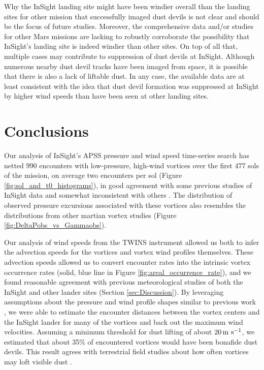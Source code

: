 \documentclass{aastex63}
\begin{document}
Why the InSight landing site might have been windier overall than the landing sites for other mission that successfully imaged dust devils is not clear and should be the focus of future studies. Moreover, the comprehensive data and/or studies for other Mars missions are lacking to robustly corroborate the possibility that InSight's landing site is indeed windier than other sites. On top of all that, multiple cases may contribute to suppression of dust devils at InSight. Although numerous nearby dust devil tracks have been imaged from space, it is possible that there is also a lack of liftable dust. In any case, the available data are at least consistent with the idea that dust devil formation was suppressed at InSight by higher wind speeds than have been seen at other landing sites. 

\section{Conclusions}
\label{sec:Conclusions}

Our analysis of InSight's APSS pressure and wind speed time-series search has netted 990 encounters with low-pressure, high-wind vortices over the first 477 sols of the mission, on average two encounters per sol (Figure \ref{fig:sol_and_t0_histograms}), in good agreement with some previous studies of InSight data \citep{2021Icar..35514119L} and somewhat inconsistent with others \citep{Spiga2021}. The distribution of observed pressure excursions associated with these vortices also resembles the distributions from other martian vortex studies (Figure \ref{fig:DeltaPobs_vs_Gammaobs}). 

Our analysis of wind speeds from the TWINS instrument allowed us both to infer the advection speeds for the vortices and vortex wind profiles themselves. These advection speeds allowed us to convert encounter rates into the intrinsic vortex occurrence rates (solid, blue line in Figure \ref{fig:areal_occurrence_rate}), and we found reasonable agreement with previous meteorological studies of both the InSight and other lander sites (Section \ref{sec:Discussion}). By leveraging assumptions about the pressure and wind profile shapes similar to previous work \citep{2016Icar..271..326L}, we were able to estimate the encounter distances between the vortex centers and the InSight lander for many of the vortices and back out the maximum wind velocities. Assuming a minimum threshold for dust lifting of about $20\,{\rm m\ s^{-1}}$, we estimated that about 35\% of encountered vortices would have been bonafide dust devils. This result agrees with terrestrial field studies about how often vortices may loft visible dust \citep{LORENZ20151}.
\end{document}
